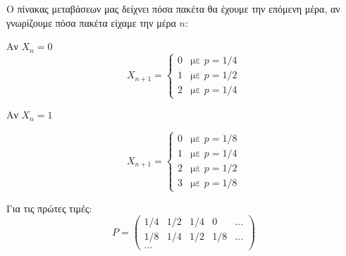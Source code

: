 \documentclass[11pt,a4paper]{article}
\begin{document}
Ο πίνακας μεταβάσεων μας δείχνει πόσα πακέτα θα έχουμε την επόμενη μέρα, αν γνωρίζουμε πόσα πακέτα είχαμε την μέρα $n$:

Αν $X_n = 0$
\begin{equation*}
    X_{n+1} =
    \begin{cases}
        0 & \text{με $p=1/4$} \\
        1 & \text{με $p=1/2$} \\
        2 & \text{με $p=1/4$}
    \end{cases}
\end{equation*}

Αν $X_n = 1$

\begin{equation*}
    X_{n+1} =
    \begin{cases}
        0 & \text{με $p=1/8$} \\
        1 & \text{με $p=1/4$} \\
        2 & \text{με $p=1/2$} \\
        3 & \text{με $p=1/8$}
    \end{cases}
\end{equation*}

Για τις πρώτες τιμές:
\begin{equation*}
    P =
    \begin{pmatrix}
        1/4 & 1/2 & 1/4 & 0   & \dots \\
        1/8 & 1/4 & 1/2 & 1/8 & \dots \\
        ...
    \end{pmatrix}
\end{equation*}
\end{document}
